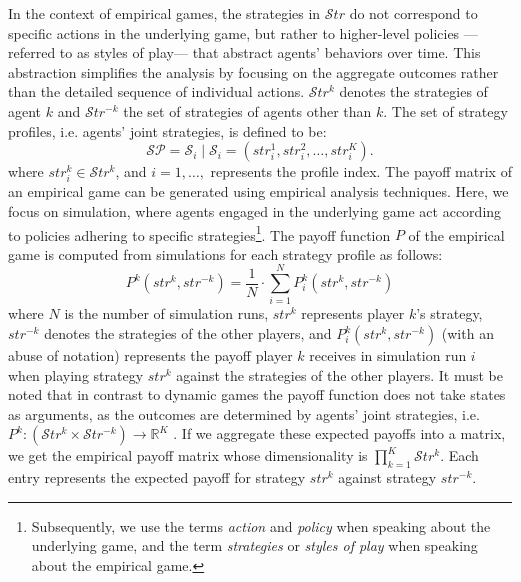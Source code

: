 \begin{flushleft}
    In the context of empirical games, the strategies in $\mathcal{S}tr$ do not correspond to specific actions in the underlying game, but rather to higher-level policies —referred to as styles of play— that abstract agents' behaviors over time. This abstraction simplifies the analysis by focusing on the aggregate outcomes rather than the detailed sequence of individual actions. $\mathcal{S}tr^k$ denotes the strategies of agent $k$ and $\mathcal{S}tr^{-k}$ the set of strategies of agents other than $k$. The set of strategy profiles, i.e. agents' joint strategies, is defined to be:
    \begin{equation}
        \mathcal{SP} = \mathcal{S}_i \mid \mathcal{S}_i = (str_i^1, str_i^2, \dots, str_i^K).
        \label{eq:strategy_profiles}
    \end{equation}
    where $str_i^k \in \mathcal{S}tr^k$, and $i = 1, \dots,$ represents the profile index. The payoff matrix of an empirical game can be generated using empirical analysis techniques. Here, we focus on simulation, where agents engaged in the underlying game act according to policies adhering to specific strategies\footnote{Subsequently, we use the terms \emph{action} and \emph{policy} when speaking about the underlying game, and the term \emph{strategies} or \emph{styles of play} when speaking about the empirical game.}. The payoff function $P$ of the empirical game is computed from simulations for each strategy profile as follows:
    \begin{equation}
        P^k(str^k, str^{-k}) =\frac{1}{N} \cdot \sum_{i=1}^{N} P^k_{i}(str^k, str^{-k})
        \label{eq:meta_payoff}
    \end{equation}
    where $N$ is the number of simulation runs, $str^k$ represents player $k$'s strategy, $str^{-k}$ denotes the strategies of the other players, and $P^k_{i}(str^k, str^{-k})$ (with an abuse of notation) represents the payoff player $k$ receives in simulation run $i$ when playing strategy $str^k$ against the strategies of the other players. It must be noted that in contrast to dynamic games the payoff function does not take states as arguments, as the outcomes are determined by agents' joint strategies, i.e. $P^k: (\mathcal{S}tr^k \times \mathcal{S}tr^{-k}) \to \mathbb{R}^K$ \cite{omidshafiei2019alpharank}. If we aggregate these expected payoffs into a matrix, we get the empirical payoff matrix whose dimensionality is $\prod_{k=1}^K\mathcal{S}tr^k$. Each entry represents the expected payoff for strategy $str^k$ against strategy $str^{-k}$.

\end{flushleft}